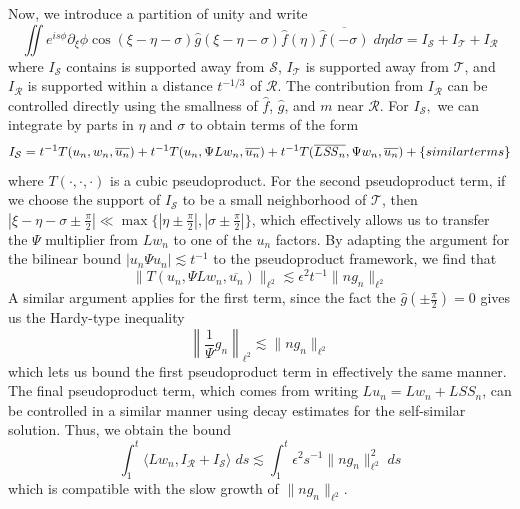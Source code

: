 \documentclass[letterpaper, reqno,final]{amsart}
\newcommand{\cS}{\mathcal{S}}
\newcommand{\cR}{\mathcal{R}}
\newcommand{\fhPi}{\frac{\pi}{2}}
\newcommand{\mSS}{\mathit{SS}}
\newcommand{\btext}[1]{\left\{\textup{#1}\right\}}
\newcommand{\bsim}{\btext{similar terms}}
\begin{document}
Now, we introduce a partition of unity and write
\begin{equation*}
    \iint e^{is\phi} \partial_\xi \phi \cos(\xi - \eta - \sigma) \hat g(\xi-\eta-\sigma)\hat f(\eta) \overline{\hat f(-\sigma)}\;d\eta d\sigma = I_\mathcal{S} + I_\mathcal{T} + I_\mathcal{R}
\end{equation*}
where $I_\mathcal{S}$ contains is supported away from $\mathcal{S}$, $I_\mathcal{T}$ is supported away from $\mathcal{T}$, and $I_\mathcal{R}$ is supported within a distance $t^{-1/3}$ of $\mathcal{R}$.  The contribution from $I_\mathcal{R}$ can be controlled directly using the smallness of $\hat{f}$, $\hat{g}$, and $m$ near $\mathcal{R}$.  For $I_\mathcal{S},$ we can integrate by parts in $\eta$ and $\sigma$ to obtain terms of the form
\begin{equation*}\begin{split}
    I_\mathcal{S} = t^{-1}T(u_n, w_n, \overline{u_n}) + t^{-1}T(u_n, \Psi Lw_n, \overline{u_n}) + t^{-1}T(\overline{L\mSS_n}, \Psi w_n, \overline{u_n}) + \bsim
\end{split}\end{equation*}
where $T(\cdot,\cdot,\cdot)$ is a cubic pseudoproduct.  For the second pseudoproduct term, if we choose the support of $I_\mathcal{S}$ to be a small neighborhood of $\mathcal{T}$, then $|\xi - \eta - \sigma \pm \fhPi| \ll \max\{|\eta \pm \fhPi|,|\sigma \pm \fhPi|\}$, which effectively allows us to transfer the $\Psi$ multiplier from $Lw_n$ to one of the $u_n$ factors.  By adapting the argument for the bilinear bound $|u_n \Psi u_n| \lesssim t^{-1}$ to the pseudoproduct framework, we find that
\begin{equation*}
    \lVert T(u_n, \Psi Lw_n, \overline{u_n}) \rVert_{\ell^2} \lesssim \epsilon^2 t^{-1} \lVert ng_n \rVert_{\ell^2}
\end{equation*}
A similar argument applies for the first term, since the fact the $\hat{g}(\pm\fhPi) = 0$ gives us the Hardy-type inequality
\begin{equation*}
    \left\lVert \frac{1}{\Psi} g_n \right\rVert_{\ell^2} \lesssim \lVert n g_n \rVert_{\ell^2}
\end{equation*}
which lets us bound the first pseudoproduct term in effectively the same manner.  The final pseudoproduct term, which comes from writing $Lu_n = Lw_n + L\mSS_n$, can be controlled in a similar manner using decay estimates for the self-similar solution.  Thus, we obtain the bound
\begin{equation*}
    \int_1^t \langle Lw_n, I_\cR + I_\cS \rangle\;ds \lesssim \int_1^t \epsilon^2 s^{-1}\lVert ng_n \rVert_{\ell^2}^2\;ds
\end{equation*}
which is compatible with the slow growth of $\lVert ng_n \rVert_{\ell^2}$.
\end{document}
